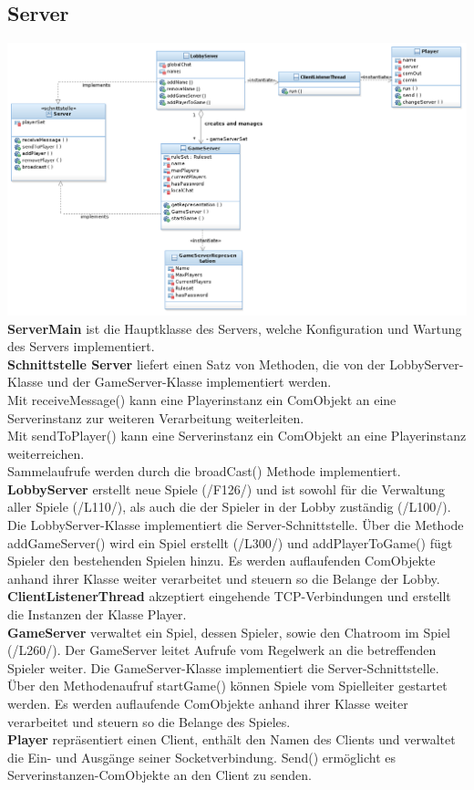 \documentclass{article}
\begin{document}
\subsection{Server}
\includegraphics[width=\textwidth]{Server}
\textbf{ServerMain} ist die Hauptklasse des Servers, welche Konfiguration und Wartung des Servers implementiert. \\
		\textbf{Schnittstelle Server} liefert einen Satz von Methoden, die von der LobbyServer-Klasse und der GameServer-Klasse implementiert werden. \\
		Mit receiveMessage() kann eine Playerinstanz ein ComObjekt an eine Serverinstanz zur weiteren Verarbeitung weiterleiten. \\
		Mit sendToPlayer() kann eine Serverinstanz ein ComObjekt an eine Playerinstanz weiterreichen. \\
		Sammelaufrufe werden durch die broadCast() Methode implementiert.
		\textbf{LobbyServer} erstellt neue Spiele (/F126/) und ist sowohl für die Verwaltung aller Spiele (/L110/), als auch die der Spieler in der Lobby zuständig (/L100/). Die LobbyServer-Klasse implementiert die Server-Schnittstelle. Über die Methode addGameServer() wird ein Spiel erstellt (/L300/) und addPlayerToGame() fügt Spieler den bestehenden Spielen hinzu. Es werden auflaufenden ComObjekte anhand ihrer Klasse weiter verarbeitet und steuern so die Belange der Lobby. \\
		\textbf{ClientListenerThread} akzeptiert eingehende TCP-Verbindungen und erstellt die Instanzen der Klasse Player. \\
		\textbf{GameServer} verwaltet ein Spiel, dessen Spieler, sowie den Chatroom im Spiel (/L260/). Der GameServer leitet Aufrufe vom Regelwerk an die betreffenden Spieler weiter. Die GameServer-Klasse implementiert die Server-Schnittstelle. Über den Methodenaufruf startGame() können Spiele vom Spielleiter gestartet werden. Es werden auflaufende ComObjekte anhand ihrer Klasse weiter verarbeitet und steuern so die Belange des Spieles.\\
		\textbf{Player} repräsentiert einen Client, enthält den Namen des Clients und verwaltet die Ein- und Ausgänge seiner Socketverbindung. Send() ermöglicht es Serverinstanzen-ComObjekte an den Client zu senden. \\
\end{document}

